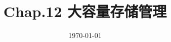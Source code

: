 \documentclass[a4paper]{ctexart}
\date{\today}
\title{Chap.12 大容量存储管理}
\begin{document}
    \header
    
\end{document}
